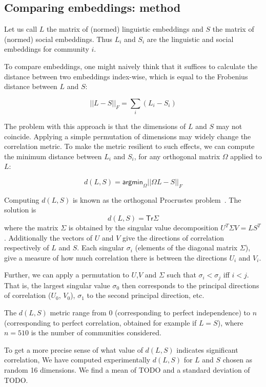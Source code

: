\documentclass[11pt]{article}
\begin{document}
\subsection{Comparing embeddings: method}

Let us call \(L\) the matrix of (normed) linguistic embeddings and \(S\) the matrix
of (normed) social embeddings. Thus \(L_i\) and \(S_i\) are the linguistic and
social embeddings for community \(i\).

To compare embeddings, one might naively think that it suffices to
calculate the distance between two embeddings index-wise, which is
equal to the Frobenius distance between \(L\) and \(S\):

\[||L-S||_F = \sum_i (L_i - S_i)\]

The problem with this approach is that the dimensions of \(L\) and \(S\) may
not coincide. Applying a simple permutation of dimensions may widely
change the correlation metric. To make the metric resilient to such
effects, we can compute the minimum distance between \(L_i\) and \(S_i\), for
any orthogonal matrix \(\Omega\) applied to \(L\):

\[d(L,S) = \mathsf{argmin}_\Omega ||ΩL-S||_F\]

Computing \(d(L,S)\) is known as the orthogonal Procrustes problem~\citep{Gower2004}. The
solution is
\[d(L,S) = \mathsf {Tr} Σ\] where the matrix \(Σ\) is obtained by the singular value
decomposition \(U^TΣV = LS^T\). Additionally the vectors of \(U\) and \(V\) give
the directions of correlation respectively of \(L\) and \(S\). Each
singular \(\sigma_i\) (elements of the diagonal matrix \(Σ\)), give a measure of how much
correlation there is between the directions \(U_i\) and \(V_i\).

Further, we can apply a permutation to \(U\),\(V\) and \(Σ\) such that \(σ_i < σ_j\) iff \(i < j\). That
is, the largest singular value \(σ_0\) then corresponds to the principal
directions of correlation (\(U_0\), \(V_0\)), \(σ_1\) to the second
principal direction, etc. 

The \(d(L,S)\) metric range from \(0\) (corresponding to perfect
independence) to \(n\) (corresponding to perfect correlation, obtained
for example if \(L=S\)), where $n=510$ is the number of communities
considered.

To get a more precise sense of what value of \(d(L,S)\) indicates significant correlation,
We have computed experimentally \(d(L,S)\) for 
\(L\) and \(S\) chosen as random 16 dimensions. We find
a mean of TODO and a standard deviation of TODO.
\end{document}
